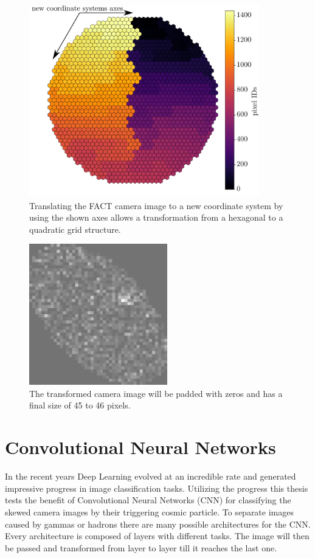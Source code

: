 \begin{figure}
    \centering
    \includegraphics[width=100mm]{Plots/FACT_Image.pdf}
    \caption{Translating the FACT camera image to a new coordinate system by using the shown axes allows a transformation from a hexagonal to a quadratic grid structure.}
    \label{fig:fact_image}
\end{figure}

\begin{figure}
    \centering
    \includegraphics[width=60mm]{Plots/Preprocessed_Image.png}
    \caption{The transformed camera image will be padded with zeros and has a final size of \num{45} to \num{46} pixels.}
    \label{fig:preprocessed_image}
\end{figure}



\section{Convolutional Neural Networks}
In the recent years Deep Learning evolved at an incredible rate and generated impressive progress in image classification tasks.
Utilizing the progress this thesis tests the benefit of Convolutional Neural Networks (CNN) for classifying the skewed camera images
by their triggering cosmic particle.
To separate images caused by gammas or hadrons there are many possible architectures for the CNN.
Every architecture is composed of layers with different tasks.
The image will then be passed and transformed from layer to layer till it reaches the last one.

